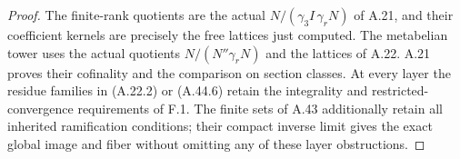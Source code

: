 \begin{proof}
The finite-rank quotients are the actual
$N/(\gamma_3I\,\gamma_rN)$ of A.21,
and their coefficient kernels are precisely
the free lattices just computed. The
metabelian tower uses the actual quotients
$N/(N''\gamma_rN)$ and the lattices of
A.22. A.21 proves their cofinality and the
comparison on section classes. At every
layer the residue families in (A.22.2) or
(A.44.6) retain the integrality and
restricted-convergence requirements of
F.1. The finite sets of A.43 additionally
retain all inherited ramification conditions;
their compact inverse limit gives the exact
global image and fiber without omitting any
of these layer obstructions.
\end{proof}
